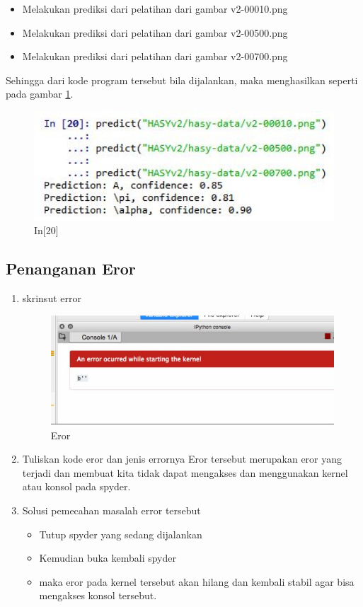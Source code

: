 \begin{enumerate}
\begin{itemize}
\item Melakukan prediksi dari pelatihan dari gambar v2-00010.png
\item Melakukan prediksi dari pelatihan dari gambar v2-00500.png
\item Melakukan prediksi dari pelatihan dari gambar v2-00700.png
\end{itemize}
\par Sehingga dari kode program tersebut bila dijalankan, maka menghasilkan seperti pada gambar \ref{c7_27}.
\begin{figure}[!htbp]
	\centerline{\includegraphics[width=1\textwidth]{figures/huda/chapter7/27.JPG}}
	\caption{In[20]}
	\label{c7_27}
\end{figure}
\end{enumerate}

\subsection{Penanganan Eror}
\begin{enumerate}
\item skrinsut error
\begin{figure}[!htbp]
	\centerline{\includegraphics[width=1\textwidth]{figures/huda/chapter7/eror.JPG}}
	\caption{Eror}
	\label{c7_28}
\end{figure}
\item Tuliskan kode eror dan jenis errornya
\subitem Eror tersebut merupakan eror yang terjadi dan membuat kita tidak dapat mengakses dan menggunakan kernel atau konsol pada spyder.
\item Solusi pemecahan masalah error tersebut
\begin{itemize}
\item Tutup spyder yang sedang dijalankan
\item Kemudian buka kembali spyder
\item maka eror pada kernel tersebut akan hilang dan kembali stabil agar bisa mengakses konsol tersebut.
\end{itemize}
\end{enumerate}
